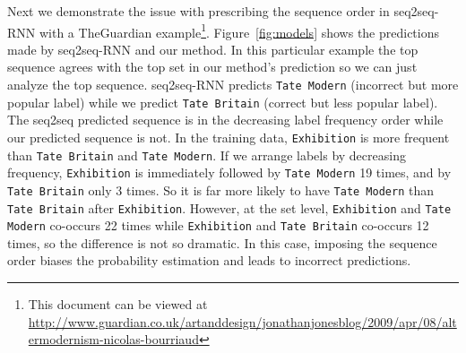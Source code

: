 Next we demonstrate the issue with prescribing the sequence order in seq2seq-RNN with a TheGuardian example\footnote{\scriptsize This document can be viewed at \url{http://www.guardian.co.uk/artanddesign/jonathanjonesblog/2009/apr/08/altermodernism-nicolas-bourriaud}}. Figure~\ref{fig:models} shows the predictions made by seq2seq-RNN and our method. In this particular example the top sequence agrees with the top set in our method's prediction so we can just analyze the top sequence. seq2seq-RNN predicts \texttt{Tate Modern} (incorrect but more popular label) while we predict \texttt{Tate Britain} (correct but less popular label). The seq2seq predicted sequence is in the decreasing label frequency order while our predicted sequence is not. In the training data, \texttt{Exhibition} is more frequent than \texttt{Tate Britain} and \texttt{Tate Modern}. If we arrange labels by decreasing frequency, \texttt{Exhibition} is immediately followed by \texttt{Tate Modern} 19 times, and by \texttt{Tate Britain} only 3 times. So it is far more likely to have \texttt{Tate Modern} than \texttt{Tate Britain} after \texttt{Exhibition}. However,  at the set level, \texttt{Exhibition} and \texttt{Tate Modern} co-occurs 22 times while \texttt{Exhibition} and \texttt{Tate Britain} co-occurs 12 times, so the difference is not so dramatic. In this case, imposing the sequence order biases the probability estimation and leads to incorrect predictions.
%
%
%

